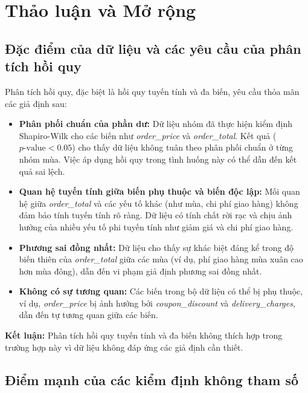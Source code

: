 \vfil{}\vfilneg
\section{Thảo luận và Mở rộng}

\subsection{Đặc điểm của dữ liệu và các yêu cầu của phân tích hồi quy}
Phân tích hồi quy, đặc biệt là hồi quy tuyến tính và đa biến, yêu cầu thỏa mãn các giả định sau:

\begin{itemize}
    \item \textbf{Phân phối chuẩn của phần dư:}  
    Dữ liệu nhóm đã thực hiện kiểm định Shapiro-Wilk cho các biến như \textit{order\_price} và \textit{order\_total}. Kết quả ($p\text{-value} < 0.05$) cho thấy dữ liệu không tuân theo phân phối chuẩn ở từng nhóm mùa. Việc áp dụng hồi quy trong tình huống này có thể dẫn đến kết quả sai lệch.

    \item \textbf{Quan hệ tuyến tính giữa biến phụ thuộc và biến độc lập:}  
    Mối quan hệ giữa \textit{order\_total} và các yếu tố khác (như mùa, chi phí giao hàng) không đảm bảo tính tuyến tính rõ ràng. Dữ liệu có tính chất rời rạc và chịu ảnh hưởng của nhiều yếu tố phi tuyến tính như giảm giá và chi phí giao hàng.

    \item \textbf{Phương sai đồng nhất:}  
    Dữ liệu cho thấy sự khác biệt đáng kể trong độ biến thiên của \textit{order\_total} giữa các mùa (ví dụ, phí giao hàng mùa xuân cao hơn mùa đông), dẫn đến vi phạm giả định phương sai đồng nhất.

    \item \textbf{Không có sự tương quan:}  
    Các biến trong bộ dữ liệu có thể bị phụ thuộc, ví dụ, \textit{order\_price} bị ảnh hưởng bởi \textit{coupon\_discount} và \textit{delivery\_charges}, dẫn đến tự tương quan giữa các biến.
\end{itemize}

\noindent
\textbf{Kết luận:}  
Phân tích hồi quy tuyến tính và đa biến không thích hợp trong trường hợp này vì dữ liệu không đáp ứng các giả định cần thiết.

\subsection{Điểm mạnh của các kiểm định không tham số}

